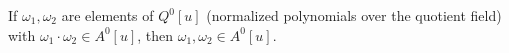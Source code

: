 If $\omega_1, \omega_2$ are elements of $Q^0[u]$ (normalized polynomials over the quotient field) with $\omega_1 \cdot \omega_2 \in A^0[u]$, then $\omega_1, \omega_2 \in A^0[u]$.
